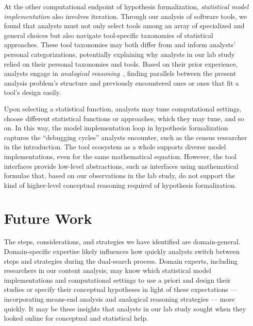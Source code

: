 At the other computational endpoint of hypothesis formalization, \textit{statistical model implementation}
also involves iteration. Through our analysis of software tools, we
found that analysts must not only select tools among an array of specialized and
general choices but also navigate tool-specific taxonomies of statistical
approaches. These tool taxonomies may both differ from and inform analysts'
personal categorizations, potentially explaining why analysts in our lab study
relied on their personal taxonomies and tools. Based on their prior experience, analysts engage in
\textit{analogical reasoning}~\cite{holland1989induction}, finding parallels between the present analysis
problem's structure and previously encountered ones or ones that fit a tool's
design easily.

Upon selecting a statistical function, analysts may tune computational settings,
choose different statistical functions or approaches, which they may tune, and
so on. In this way, the model implementation loop in hypothesis
formalization captures the ``debugging cycles'' analysts encounter, such as the census
researcher in the introduction. The tool ecosystem as a
whole supports diverse model implementations, even for the same
mathematical equation. However, the tool interfaces provide low-level abstractions, such as
interfaces using mathematical formulae that, based on our observations in the
lab study, do not support the kind of higher-level conceptual reasoning required
of hypothesis formalization.


\section{Future Work}
The steps, considerations, and strategies we have identified are domain-general.
Domain-specific expertise likely influences how quickly analysts switch between
steps and strategies during the dual-search process. Domain experts, including
researchers in our content analysis, may know which statistical model
implementations and computational settings to use a priori and design their
studies or specify their conceptual hypotheses in light of these expectations
--- incorporating means-end analysis and analogical reasoning strategies ---
more quickly. It may be these insights that analysts in our lab study sought
when they looked online for conceptual and statistical help. 

